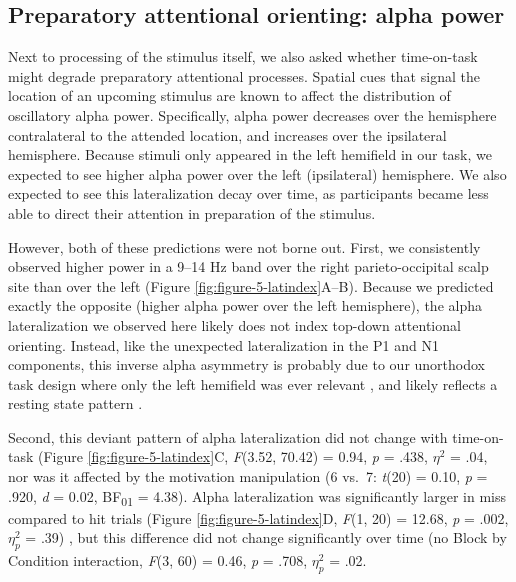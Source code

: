 \documentclass[11pt,]{memoir}
\begin{document}
\hypertarget{preparatory-attentional-orienting-alpha-power}{%
\subsection{Preparatory attentional orienting: alpha power}\label{preparatory-attentional-orienting-alpha-power}}

Next to processing of the stimulus itself, we also asked whether time-on-task might degrade preparatory attentional processes. Spatial cues that signal the location of an upcoming stimulus are known to affect the distribution of oscillatory alpha power. Specifically, alpha power decreases over the hemisphere contralateral to the attended location, and increases over the ipsilateral hemisphere. Because stimuli only appeared in the left hemifield in our task, we expected to see higher alpha power over the left (ipsilateral) hemisphere. We also expected to see this lateralization decay over time, as participants became less able to direct their attention in preparation of the stimulus.

However, both of these predictions were not borne out. First, we consistently observed higher power in a 9--14 Hz band over the right parieto-occipital scalp site than over the left (Figure \ref{fig:figure-5-latindex}A--B). Because we predicted exactly the opposite (higher alpha power over the left hemisphere), the alpha lateralization we observed here likely does not index top-down attentional orienting. Instead, like the unexpected lateralization in the P1 and N1 components, this inverse alpha asymmetry is probably due to our unorthodox task design where only the left hemifield was ever relevant \autocite[as further discussed in][]{Slagter2016}, and likely reflects a resting state pattern \autocites{Benwell2018}{Wieneke1980}.

Second, this deviant pattern of alpha lateralization did not change with time-on-task (Figure \ref{fig:figure-5-latindex}C, \emph{F}(3.52, 70.42) = 0.94, \emph{p} = .438, \(\eta^2\) = .04, nor was it affected by the motivation manipulation (6 vs.~7: \emph{t}(20) = 0.10, \emph{p} = .920, \emph{d} = 0.02, BF\textsubscript{01} = 4.38). Alpha lateralization was significantly larger in miss compared to hit trials (Figure \ref{fig:figure-5-latindex}D, \emph{F}(1, 20) = 12.68, \emph{p} = .002, \(\eta^2_p\) = .39) \autocite{Slagter2016}, but this difference did not change significantly over time (no Block by Condition interaction, \emph{F}(3, 60) = 0.46, \emph{p} = .708, \(\eta^2_p\) = .02.
\end{document}
